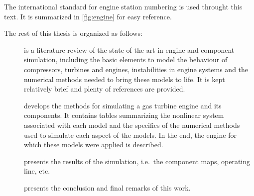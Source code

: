 \documentclass[tcc]{subfiles}
\begin{document}
The international standard for engine station numbering \cite{ARP755A} is used throught this text. It is summarized in \cref{fig:engine} for easy reference.

The rest of this thesis is organized as follows: 
\begin{description}
    \item[] is a literature review of the state of the art in engine and component simulation, including the basic elements to model the behaviour of compressors, turbines and engines, instabilities in engine systems and the numerical methods needed to bring these models to life. It is kept relatively brief and plenty of references are provided.
    \item[] develops the methods for simulating a gas turbine engine and its components. It contains tables summarizing the nonlinear system associated with each model and the specifics of the numerical methods used to simulate each aspect of the models. In the end, the engine for which these models were applied is described.
    \item[] presents the results of the simulation, i.e.\ the component maps, operating line, etc.
    \item[] presents the conclusion and final remarks of this work.
\end{description}
\end{document}
